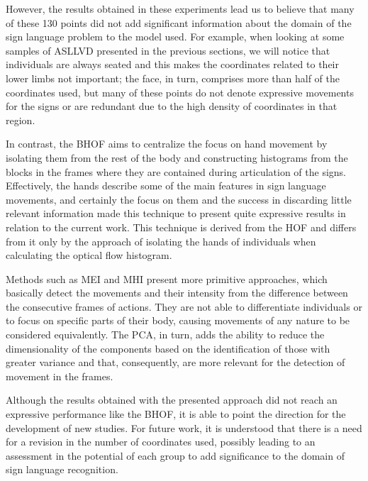However, the results obtained in these experiments lead us to believe that many of these 130 points did not add significant information about the domain of the sign language problem to the model used. For example, when looking at some samples of ASLLVD presented in the previous sections, we will notice that individuals are always seated and this makes the coordinates related to their lower limbs not important; the face, in turn, comprises more than half of the coordinates used, but many of these points do not denote expressive movements for the signs or are redundant due to the high density of coordinates in that region.

In contrast, the BHOF \cite{lim-2016} aims to centralize the focus on hand movement by isolating them from the rest of the body and constructing histograms from the blocks in the frames where they are contained during articulation of the signs. Effectively, the hands describe some of the main features in sign language movements, and certainly the focus on them and the success in discarding little relevant information made this technique to present quite expressive results in relation to the current work. This technique is derived from the HOF and differs from it only by the approach of isolating the hands of individuals when calculating the optical flow histogram.

Methods such as MEI and MHI present more primitive approaches, which basically detect the movements and their intensity from the difference between the consecutive frames of actions. They are not able to differentiate individuals or to focus on specific parts of their body, causing movements of any nature to be considered equivalently. The PCA, in turn, adds the ability to reduce the dimensionality of the components based on the identification of those with greater variance and that, consequently, are more relevant for the detection of movement in the frames.

Although the results obtained with the presented approach did not reach an expressive performance like the BHOF, it is able to point the direction for the development of new studies. For future work, it is understood that there is a need for a revision in the number of coordinates used, possibly leading to an assessment in the potential of each group to add significance to the domain of sign language recognition.





